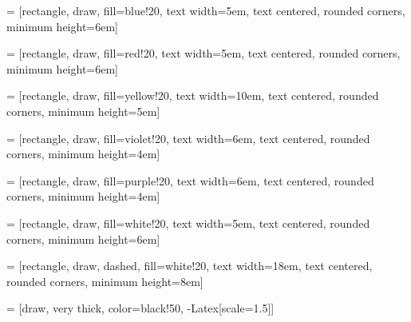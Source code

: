 
 = [rectangle, draw, fill=blue!20,
    text width=5em, text centered, rounded corners, minimum height=6em]
    
 = [rectangle, draw, fill=red!20,
    text width=5em, text centered, rounded corners, minimum height=6em]
    
 = [rectangle, draw, fill=yellow!20,
    text width=10em, text centered, rounded corners, minimum height=5em]
    
 = [rectangle, draw, fill=violet!20,
    text width=6em, text centered, rounded corners, minimum height=4em]
    
 = [rectangle, draw, fill=purple!20,
    text width=6em, text centered, rounded corners, minimum height=4em]
    
 = [rectangle, draw, fill=white!20,
    text width=5em, text centered, rounded corners, minimum height=6em]
    
 = [rectangle, draw, dashed, fill=white!20,
    text width=18em, text centered, rounded corners, minimum height=8em]
    
 = [draw, very thick, color=black!50, -{Latex[scale=1.5]}]

